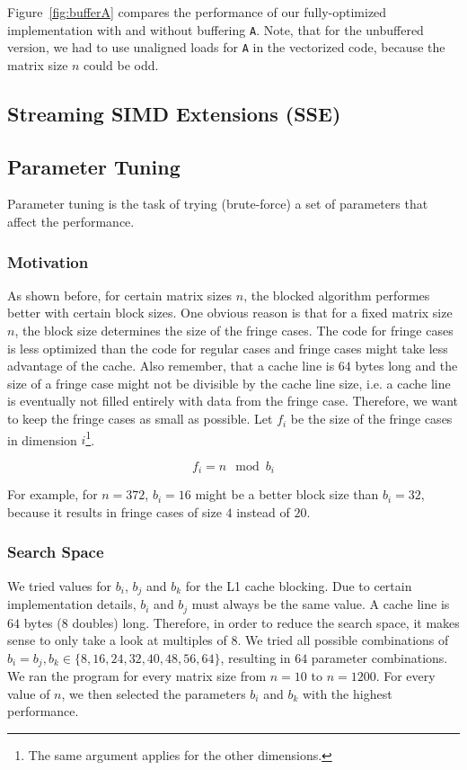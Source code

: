 \documentclass[12pt]{article}
\begin{document}
Figure~\ref{fig:bufferA} compares the performance of our fully-optimized implementation with and without buffering \lstinline{A}. Note, that for the unbuffered version, we had to use unaligned loads for \lstinline{A} in the vectorized code, because the matrix size $n$ could be odd.

\subsection{Streaming SIMD Extensions (SSE)}

\subsection{Parameter Tuning}
Parameter tuning is the task of trying (brute-force) a set of parameters that affect the performance.

\subsubsection{Motivation}
As shown before, for certain matrix sizes $n$, the blocked algorithm performes better with certain block sizes. One obvious reason is that for a fixed matrix size $n$, the block size determines the size of the fringe cases. The code for fringe cases is less optimized than the code for regular cases and fringe cases might take less advantage of the cache. Also remember, that a cache line is $64$ bytes long and the size of a fringe case might not be divisible by the cache line size, i.e. a cache line is eventually not filled entirely with data from the fringe case. Therefore, we want to keep the fringe cases as small as possible. Let $f_i$ be the size of the fringe cases in dimension $i$\footnote{The same argument applies for the other dimensions.}. 

$$f_i = n \mod b_i$$

For example, for $n=372$, $b_i=16$ might be a better block size than $b_i=32$, because it results in fringe cases of size $4$ instead of $20$.

\subsubsection{Search Space}
We tried values for $b_i$, $b_j$ and $b_k$ for the L1 cache blocking. Due to certain implementation details, $b_i$ and $b_j$ must always be the same value. A cache line is $64$ bytes ($8$ doubles) long. Therefore, in order to reduce the search space, it makes sense to only take a look at multiples of $8$. We tried all possible combinations of $b_i=b_j, b_k \in \{8, 16, 24, 32, 40, 48, 56, 64\}$, resulting in $64$ parameter combinations. We ran the program for every matrix size from $n=10$ to $n=1200$. For every value of $n$, we then selected the parameters $b_i$ and $b_k$ with the highest performance. 
\end{document}
